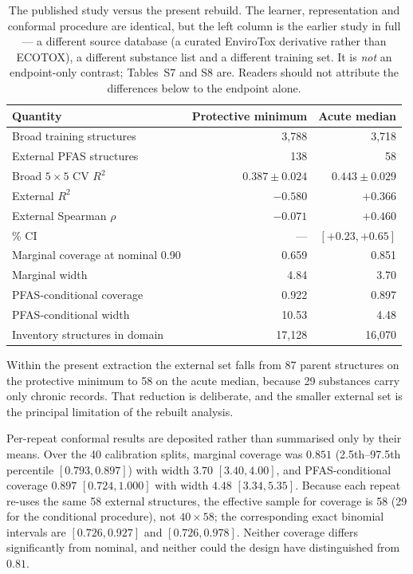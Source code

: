 \documentclass[11pt]{article}
\begin{document}
\begin{table}[h]
\centering
\caption{The published study versus the present rebuild. The learner,
representation and conformal procedure are identical, but the left column is the
earlier study in full --- a different source database (a curated EnviroTox
derivative rather than ECOTOX), a different substance list and a different
training set. It is \emph{not} an endpoint-only contrast; Tables~S7 and S8 are. Readers
should not attribute the differences below to the endpoint alone.}
\small
\begin{tabular}{lrr}
\toprule
Quantity & Protective minimum & Acute median \\
\midrule
Broad training structures & 3{,}788 & 3{,}718 \\
External PFAS structures & 138\footnotemark[1] & 58 \\
Broad $5\times5$ CV $R^2$ & $0.387\pm0.024$ & $0.443\pm0.029$ \\
External $R^2$ & $-0.580$ & $+0.366$ \\
External Spearman $\rho$ & $-0.071$ & $+0.460$ \\
\quad 95\% CI & --- & $[+0.23,+0.65]$ \\
Marginal coverage at nominal 0.90 & 0.659 & 0.851 \\
Marginal width & 4.84 & 3.70 \\
PFAS-conditional coverage & 0.922 & 0.897 \\
PFAS-conditional width & 10.53 & 4.48 \\
Inventory structures in domain & 17{,}128 & 16{,}070 \\
\bottomrule
\end{tabular}
\end{table}


Within the present extraction the external set falls from 87 parent structures
on the protective minimum to 58 on the acute median, because 29 substances carry
only chronic records. That reduction is deliberate, and the smaller external set
is the principal limitation of the rebuilt analysis.

Per-repeat conformal results are deposited rather than summarised only by their
means. Over the 40 calibration splits, marginal coverage was $0.851$ (2.5th--97.5th
percentile $[0.793,0.897]$) with width $3.70$ $[3.40,4.00]$, and
PFAS-conditional coverage $0.897$ $[0.724,1.000]$ with width $4.48$
$[3.34,5.35]$. Because each repeat re-uses the same 58 external structures, the
effective sample for coverage is 58 (29 for the conditional procedure), not
$40\times58$; the corresponding exact binomial intervals are $[0.726,0.927]$ and
$[0.726,0.978]$. Neither coverage differs significantly from nominal, and neither
could the design have distinguished from $0.81$.
\end{document}
